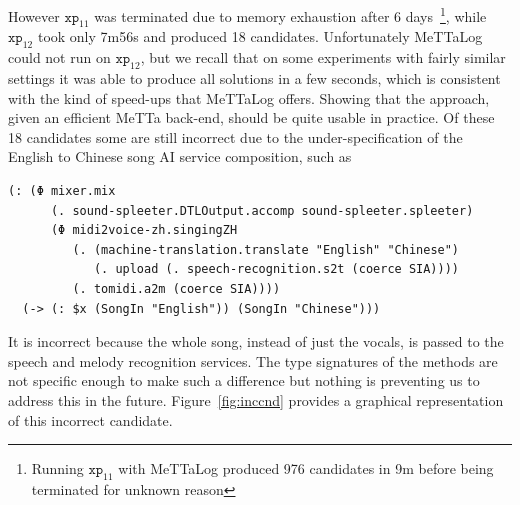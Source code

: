 \documentclass[]{report}
\begin{document}
\pagebreak
However $\texttt{xp}_{11}$ was terminated due to memory exhaustion
after 6 days~\footnote{Running $\texttt{xp}_{11}$ with MeTTaLog
produced 976 candidates in 9m before being terminated for unknown
reason}, while $\texttt{xp}_{12}$ took only 7m56s and produced 18
candidates.  Unfortunately MeTTaLog could not run on
$\texttt{xp}_{12}$, but we recall that on some experiments with fairly
similar settings it was able to produce all solutions in a few
seconds, which is consistent with the kind of speed-ups that MeTTaLog
offers.  Showing that the approach, given an efficient MeTTa back-end,
should be quite usable in practice.  Of these 18 candidates some are
still incorrect due to the under-specification of the English to
Chinese song AI service composition, such as
\begin{small}
\begin{verbatim}
(: (Φ mixer.mix
      (. sound-spleeter.DTLOutput.accomp sound-spleeter.spleeter)
      (Φ midi2voice-zh.singingZH
         (. (machine-translation.translate "English" "Chinese")
            (. upload (. speech-recognition.s2t (coerce SIA))))
         (. tomidi.a2m (coerce SIA))))
  (-> (: $x (SongIn "English")) (SongIn "Chinese")))
\end{verbatim}
\end{small}
It is incorrect because the whole song, instead of just the vocals, is
passed to the speech and melody recognition services.  The type
signatures of the methods are not specific enough to make such a
difference but nothing is preventing us to address this in the future.
Figure~\ref{fig:inccnd} provides a graphical representation of this
incorrect candidate.
\end{document}

